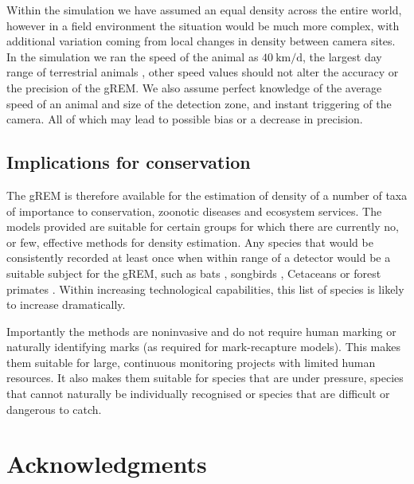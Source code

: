 \documentclass[a4paper,10pt,reqno,oneside]{amsart}
\begin{document}
Within the simulation we have assumed an equal density across the entire world, however in a field environment the situation would be much more complex, with additional variation coming from local changes in density between camera sites. In the simulation we ran the speed of the animal as  $\SI{40}{\kilo\meter \per \day}$, the largest day range of terrestrial animals \citep{carbone2005far}, other speed values should not alter the accuracy or the precision of the gREM. We also assume perfect knowledge of the average speed of an animal and size of the detection zone, and instant triggering of the camera. All of which may lead to possible bias or a decrease in precision. 

\subsection{Implications for conservation}
The gREM is therefore available for the estimation of density of a number of taxa of importance to conservation, zoonotic diseases and ecosystem services. The models provided are suitable for certain groups for which there are currently no, or few, effective methods for density estimation. Any species that would be consistently recorded at least once when within range of a detector would be a suitable subject for the gREM, such as bats \citep{kunz2009methods}, songbirds \citep{buckland2006point}, Cetaceans \citep{marques2009estimating} or forest primates \citep{hassel2008reliable}. Within increasing technological capabilities, this list of species is likely to increase dramatically.

Importantly the methods are noninvasive and do not require human marking or naturally identifying marks (as required for mark-recapture models). This makes them suitable for large, continuous monitoring projects with limited human resources. It also makes them suitable for species that are under pressure, species that cannot naturally be individually recognised or species that are difficult or dangerous to catch.


\section{Acknowledgments}



	
	
\end{document}
